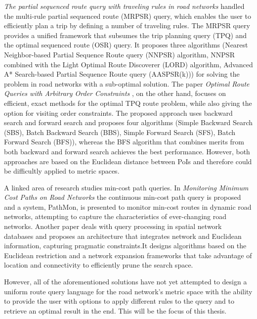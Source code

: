 \textit{The partial sequenced route query with traveling rules in road networks} \cite{multi} handled the multi-rule partial sequenced route (MRPSR) query, which enables the user to efficiently plan a trip by defining a number of traveling rules. The MRPSR query provides a unified framework that subsumes the trip planning query (TPQ) and the optimal sequenced route (OSR) query. It proposes three algorithms (Nearest Neighbor-based Partial Sequence Route query (NNPSR) algorithm, NNPSR combined with the Light Optimal Route Discoverer (LORD) algorithm, Advanced A* Search-based Partial Sequence Route query (AASPSR(k))) for solving the problem in road networks with a sub-optimal solution. The paper \textit{Optimal Route Queries with Arbitrary Order Constraints} \cite{optMulti}, on the other hand, focuses on efficient, exact methods for the optimal TPQ route problem, while also giving the option for visiting order constraints. The proposed approach uses backward search and forward search and proposes four algorithms (Simple Backward Search (SBS), Batch Backward Search (BBS), Simple Forward Search (SFS), Batch Forward Search (BFS)), whereas the BFS algorithm that combines merits from both backward and forward search achieves the best performance. However, both approaches are based on the Euclidean distance between PoIs and therefore could be difficultly applied to metric spaces.

A linked area of research studies min-cost path queries. In \textit{Monitoring Minimum Cost Paths on Road Networks} \cite{minCost} the continuous min-cost path query is proposed and a system, PathMon, is presented to monitor min-cost routes in dynamic road networks, attempting to capture the characteristics of ever-changing road networks. Another paper \cite{spatialDB} deals with query processing in spatial network databases and proposes an architecture that integrates network and Euclidean information, capturing pragmatic constraints.It designs algorithms based on the Euclidean restriction and a network expansion frameworks that take advantage of location and connectivity to efficiently prune the search space.

However, all of the aforementioned solutions have not yet attempted to design a uniform route query language for the road network's metric space with the ability to provide the user with options to apply different rules to the query and to retrieve an optimal result in the end. This will be the focus of this thesis.